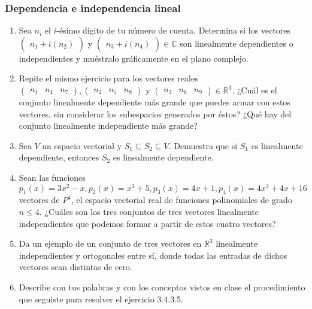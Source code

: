 \documentclass[12pt,dvipsnames]{article}
\begin{document}
\subsubsection{Dependencia e independencia lineal}

\begin{enumerate}
    \item Sea $n_i$ el $i$-ésimo dígito de tu número de cuenta. Determina si los vectores $\begin{pmatrix} n_1 + i(n_2) \end{pmatrix}$ y $\begin{pmatrix} n_3 + i(n_4) \end{pmatrix} \in \mathbb{C}$ son linealmente dependientes o independientes y muéstralo gráficamente en el plano complejo. 
    \item Repite el mismo ejercicio para los vectores reales $\begin{pmatrix} n_1 & n_4 & n_7 \end{pmatrix}, \begin{pmatrix} n_2 & n_5 & n_8 \end{pmatrix}$ y $\begin{pmatrix} n_3 & n_6 & n_9 \end{pmatrix}\in\mathbb{R}^3.$ ¿Cuál es el conjunto linealmente dependiente más grande que puedes armar con estos vectores, sin considerar los subespacios generados por éstos? ¿Qué hay del conjunto linealmente independiente más grande? 
    \item Sea $V$ un espacio vectorial y $S_1\subseteq S_2\subseteq V$. Demuestra que si $S_1$ es linealmente dependiente, entonces $S_2$ es linealmente dependiente. 
    \item Sean las funciones $p_1(x) = 3x^2-x, p_2(x) = x^3+5, p_3(x)=4x+1, p_4(x)=4x^3+4x+16$ vectores de $P^4$, el espacio vectorial real de funciones polinomiales de grado $n\le 4.$ ¿Cuáles son los tres conjuntos de tres vectores linealmente independientes que podemos formar a partir de estos cuatro vectores?  
    \item Da un ejemplo de un conjunto de tres vectores en $\mathbb{R}^3$ linealmente independientes y ortogonales entre sí, donde todas las entradas de dichos vectores sean distintas de cero.
    \item Describe con tus palabras y con los conceptos vistos en clase el procedimiento que seguiste para resolver el ejercicio 3.4.3.5.
    
\end{enumerate}
\end{document}
